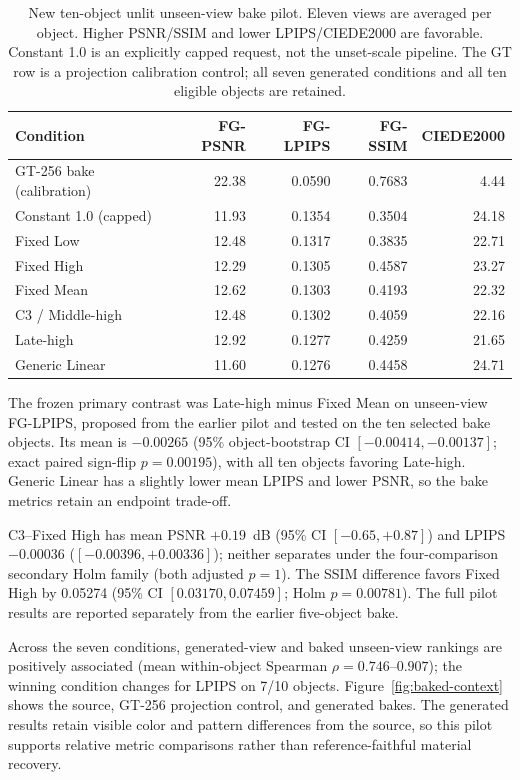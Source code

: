 \documentclass[times,twocolumn,final]{elsarticle}
\begin{document}
\begin{table}[ht]
\centering\scriptsize
\caption{New ten-object unlit unseen-view bake pilot. Eleven views are averaged per object. Higher PSNR/SSIM and lower LPIPS/CIEDE2000 are favorable. Constant 1.0 is an explicitly capped request, not the unset-scale pipeline. The GT row is a projection calibration control; all seven generated conditions and all ten eligible objects are retained.}
\label{tab:new-bake}
\begin{tabular}{lrrrr}
\toprule Condition & FG-PSNR & FG-LPIPS & FG-SSIM & CIEDE2000 \\
\midrule
GT-256 bake (calibration) & 22.38 & 0.0590 & 0.7683 & 4.44 \\
Constant 1.0 (capped) & 11.93 & 0.1354 & 0.3504 & 24.18 \\
Fixed Low & 12.48 & 0.1317 & 0.3835 & 22.71 \\
Fixed High & 12.29 & 0.1305 & 0.4587 & 23.27 \\
Fixed Mean & 12.62 & 0.1303 & 0.4193 & 22.32 \\
C3 / Middle-high & 12.48 & 0.1302 & 0.4059 & 22.16 \\
Late-high & 12.92 & 0.1277 & 0.4259 & 21.65 \\
Generic Linear & 11.60 & 0.1276 & 0.4458 & 24.71 \\
\bottomrule\end{tabular}
\end{table}

The frozen primary contrast was Late-high minus Fixed Mean on unseen-view FG-LPIPS, proposed from the earlier pilot and tested on the ten selected bake objects. Its mean is $-0.00265$ (95\% object-bootstrap CI $[-0.00414,-0.00137]$; exact paired sign-flip $p=0.00195$), with all ten objects favoring Late-high. Generic Linear has a slightly lower mean LPIPS and lower PSNR, so the bake metrics retain an endpoint trade-off.

C3--Fixed High has mean PSNR $+0.19$~dB (95\% CI $[-0.65,+0.87]$) and LPIPS $-0.00036$ ($[-0.00396,+0.00336]$); neither separates under the four-comparison secondary Holm family (both adjusted $p=1$). The SSIM difference favors Fixed High by 0.05274 (95\% CI $[0.03170,0.07459]$; Holm $p=0.00781$). The full pilot results are reported separately from the earlier five-object bake.

Across the seven conditions, generated-view and baked unseen-view rankings are positively associated (mean within-object Spearman $\rho=0.746$--$0.907$); the winning condition changes for LPIPS on 7/10 objects. Figure~\ref{fig:baked-context} shows the source, GT-256 projection control, and generated bakes. The generated results retain visible color and pattern differences from the source, so this pilot supports relative metric comparisons rather than reference-faithful material recovery.
\end{document}
